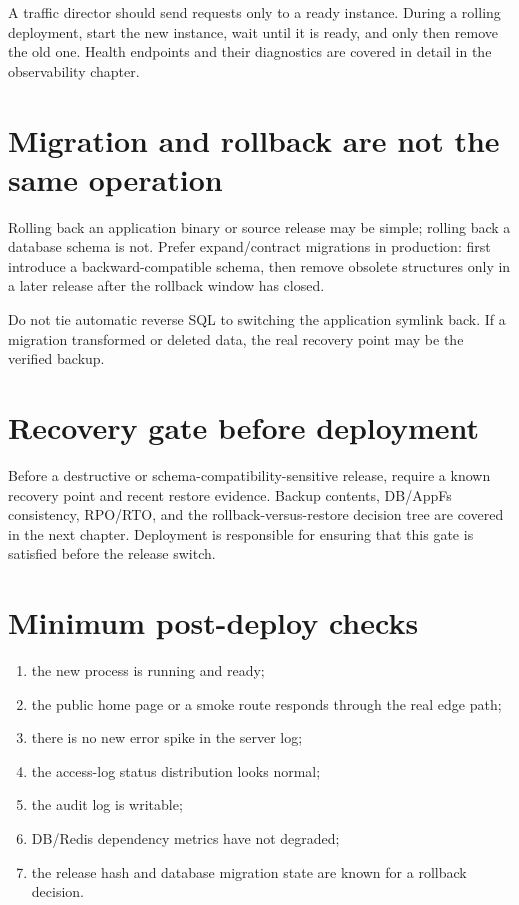 A traffic director should send requests only to a ready instance. During a rolling deployment, start the new instance, wait until it is ready, and only then remove the old one. Health endpoints and their diagnostics are covered in detail in the observability chapter.

\section{Migration and rollback are not the same operation}

Rolling back an application binary or source release may be simple; rolling back a database schema is not. Prefer expand/contract migrations in production: first introduce a backward-compatible schema, then remove obsolete structures only in a later release after the rollback window has closed.

Do not tie automatic reverse SQL to switching the application symlink back. If a migration transformed or deleted data, the real recovery point may be the verified backup.

\section{Recovery gate before deployment}

Before a destructive or schema-compatibility-sensitive release, require a known recovery point and recent restore evidence. Backup contents, DB/AppFs consistency, RPO/RTO, and the rollback-versus-restore decision tree are covered in the next chapter. Deployment is responsible for ensuring that this gate is satisfied before the release switch.

\section{Minimum post-deploy checks}

\begin{enumerate}
  \item the new process is running and ready;
  \item the public home page or a smoke route responds through the real edge path;
  \item there is no new error spike in the server log;
  \item the access-log status distribution looks normal;
  \item the audit log is writable;
  \item DB/Redis dependency metrics have not degraded;
  \item the release hash and database migration state are known for a rollback decision.
\end{enumerate}
